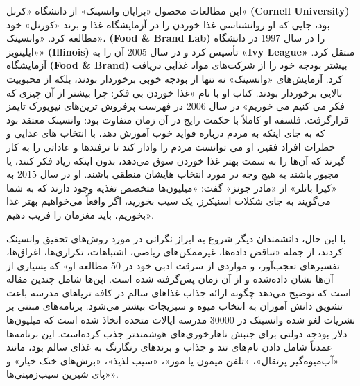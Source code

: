 این مطالعات محصول «برایان وانسینک» از دانشگاه «کرنل» \textenglish{\textbf{(Cornell University)}}  بود، جایی که او روانشناسی غذا خوردن را در آزمایشگاه غذا و برند «کورنل» خود مطالعه کرد.
«وانسینک»، \textenglish{\textbf{(Food \& Brand Lab)}} را در سال 1997 در دانشگاه «ایلینویز» \textenglish{\textbf{(Illinois)}} تأسیس کرد و در سال 2005 آن را به \textenglish{\textbf{«Ivy League»}} منتقل کرد.
آزمایشگاه \textenglish{\textbf{(Food \& Brand)}} بیشتر بودجه خود را از شرکت‌های مواد غذایی دریافت کرد.
آزمایش‌های «وانسینک» نه تنها از بودجه خوبی برخوردار بودند، بلکه از محبوبیت بالایی برخوردار بودند.
کتاب او با نام «غذا خوردن بی فکر: چرا بیشتر از آن چیزی که فکر می کنیم می خوریم» در سال 2006 در فهرست پرفروش ترین‌های نیویورک تایمز قرار‌گرفت.
فلسفه او کاملاً با حکمت رایج در آن زمان متفاوت بود: وانسینک معتقد بود که به جای اینکه به مردم درباره فواید خوب آموزش دهد، با انتخاب های غذایی و خطرات افراد فقیر، او می توانست مردم را وادار کند تا ترفندها و عاداتی را به کار گیرند که آن‌ها را به سمت بهتر غذا خوردن سوق می‌دهد، بدون اینکه زیاد فکر کنند، یا مجبور باشند به هیچ وجه در مورد انتخاب هایشان منطقی باشند.
او در سال 2015 به «کیرا باتلر» از «مادر جونز» گفت: «میلیون‌ها متخصص تغذیه وجود دارند که به شما می‌گویند به جای شکلات اسنیکرز، یک سیب بخورید، اگر واقعاً می‌خواهیم بهتر غذا بخوریم، باید مغزمان را فریب دهیم».

با این حال، دانشمندان دیگر شروع به ابراز نگرانی در مورد روش‌های تحقیق وانسینک کردند، از جمله «تناقض داده‌ها، غیرممکن‌های ریاضی، اشتباهات، تکراری‌ها، اغراق‌ها، تفسیرهای تعجب‌آور، و مواردی از سرقت ادبی خود در 50 مطالعه او» که بسیاری از آن‌ها نشان داده‌شده و از آن زمان پس‌گرفته شده است.
این‌ها شامل چندین مقاله است که توضیح می‌دهد چگونه ارائه جذاب غذاهای سالم در کافه تریاهای مدرسه باعث تشویق دانش آموزان به انتخاب میوه و سبزیجات بیشتر می‌شود.
برنامه‌های مبتنی بر نشریات لغو شده وانسینک در 30000 مدرسه ایالات متحده اتخاذ شده است که میلیون‌ها دلار بودجه دولتی برای جنبش ناهارخوری‌های هوشمندتر جذب کرده‌است.
این برنامه‌ها عمدتاً شامل دادن نام‌های تند و جذاب و برندهای رنگارنگ به غذای سالم بود، مانند «آب‌میوه‌گیر پرتقال»، «تلفن میمون یا موز»، «سیب لذیذ»، «برش‌های خنک خیار» و «پای شیرین سیب‌زمینی‌ها».

